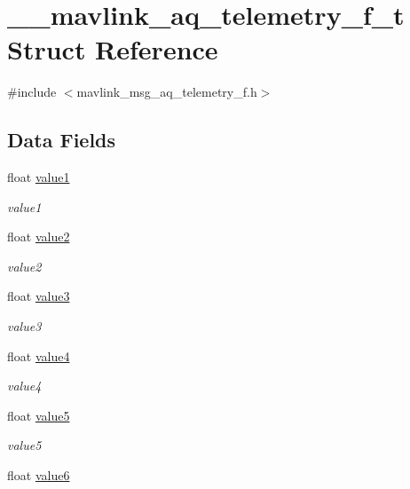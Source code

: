 \hypertarget{struct____mavlink__aq__telemetry__f__t}{\section{\+\_\+\+\_\+mavlink\+\_\+aq\+\_\+telemetry\+\_\+f\+\_\+t Struct Reference}
\label{struct____mavlink__aq__telemetry__f__t}
}


{\ttfamily \#include $<$mavlink\+\_\+msg\+\_\+aq\+\_\+telemetry\+\_\+f.\+h$>$}

\subsection*{Data Fields}
\begin{DoxyCompactItemize}
\item 
float \hyperlink{struct____mavlink__aq__telemetry__f__t_a51eb0d7e1e75af5f7bbc6747378f64e6}{value1}
\begin{DoxyCompactList}\small\item\em value1 \end{DoxyCompactList}\item 
float \hyperlink{struct____mavlink__aq__telemetry__f__t_a936beaabb31290ef9214a0d4d8f7cfc6}{value2}
\begin{DoxyCompactList}\small\item\em value2 \end{DoxyCompactList}\item 
float \hyperlink{struct____mavlink__aq__telemetry__f__t_a98f486eb5671c8920117e7f179cfe41f}{value3}
\begin{DoxyCompactList}\small\item\em value3 \end{DoxyCompactList}\item 
float \hyperlink{struct____mavlink__aq__telemetry__f__t_a9f8293c8846faa8507f349ff0e97f683}{value4}
\begin{DoxyCompactList}\small\item\em value4 \end{DoxyCompactList}\item 
float \hyperlink{struct____mavlink__aq__telemetry__f__t_ab776db3f63b0c78e15651180f292c9f2}{value5}
\begin{DoxyCompactList}\small\item\em value5 \end{DoxyCompactList}\item 
float \hyperlink{struct____mavlink__aq__telemetry__f__t_ab8c2b1b58f200ba87f020cd184b26952}{value6}

\end{DoxyCompactItemize}
